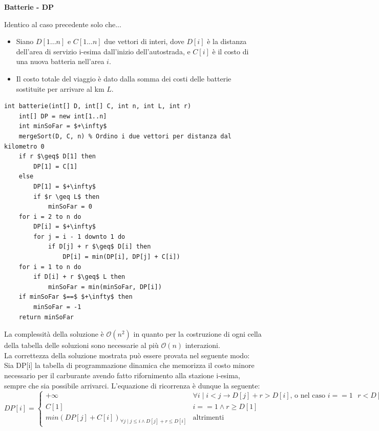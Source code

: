 \documentclass[../cheatSheetAlgoritmi.tex]{subfiles}
\begin{document}
\newpage
\begin{flushleft}
\textbf{Batterie - DP}
\end{flushleft}
Identico al caso precedente solo che...\\
\begin{itemize}
	\item Siano $D[1...n]$ e $C[1...n]$ due vettori di interi, dove $D[i]$ è la distanza dell'area di servizio i-esima dall'inizio dell'autostrada, e $C[i]$ è il costo di una nuova batteria nell'area $i$.
	\item Il costo totale del viaggio è dato dalla somma dei costi delle batterie sostituite per arrivare al km $L$.
\end{itemize}
\begin{lstlisting}[caption=Batterie DP]
int batterie(int[] D, int[] C, int n, int L, int r)
    int[] DP = new int[1..n]
    int minSoFar = $+\infty$
    mergeSort(D, C, n) % Ordino i due vettori per distanza dal kilometro 0
    if r $\geq$ D[1] then
        DP[1] = C[1]
    else
        DP[1] = $+\infty$
        if $r \geq L$ then
            minSoFar = 0
    for i = 2 to n do
        DP[i] = $+\infty$
        for j = i - 1 downto 1 do
            if D[j] + r $\geq$ D[i] then
                DP[i] = min(DP[i], DP[j] + C[i])
    for i = 1 to n do
        if D[i] + r $\geq$ L then
            minSoFar = min(minSoFar, DP[i])
    if minSoFar $==$ $+\infty$ then
        minSoFar = -1
    return minSoFar
\end{lstlisting}
La complessità della soluzione è $\mathcal{O}(n^2)$ in quanto per la costruzione di ogni cella della tabella delle soluzioni sono necessarie al più $\mathcal{O}(n)$ interazioni. \\
La correttezza della soluzione mostrata può essere provata nel seguente modo: \\
Sia DP[i] la tabella di programmazione dinamica che memorizza il costo minore necessario per il carburante avendo fatto rifornimento alla stazione i-esima, sempre che sia possibile arrivarci. L'equazione di ricorrenza è dunque la seguente:
\begin{equation*}
    DP[i]=\begin{cases}
        + \infty & \text{$\forall i \mid i < j \rightarrow D[j] + r > D[i]$, o nel caso $i == 1$ $r < D[1]$} \\
        C[1] & \text{$i == 1 \land r \geq D[1]$}\\
        min(DP[j] + C[i])_{\forall j \mid j \leq i \land D[j] + r \leq D[i]} & \text{altrimenti}
    \end{cases}
\end{equation*} \\
\end{document}

